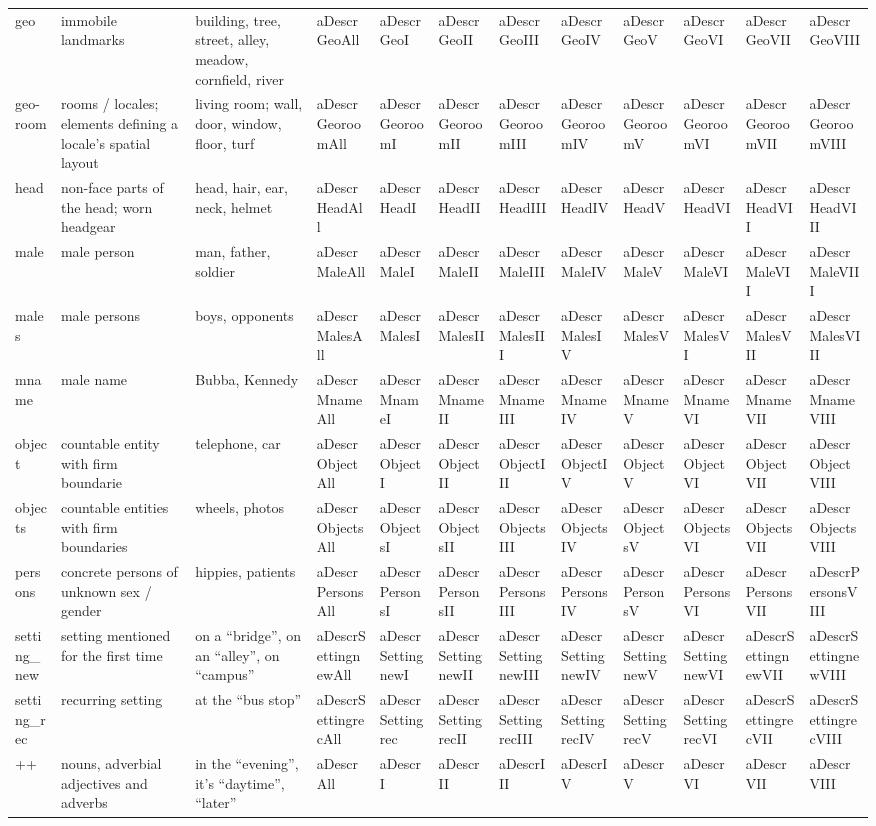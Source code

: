 \documentclass[english]{article}
\begin{document}
\begin{table}[t]
\begin{tabular}{llllllllllll}
geo & immobile landmarks & building, tree, street, alley, meadow, cornfield, river & aDescrGeoAll & aDescrGeoI & aDescrGeoII & aDescrGeoIII & aDescrGeoIV & aDescrGeoV & aDescrGeoVI & aDescrGeoVII & aDescrGeoVIII \tabularnewline
geo-room & rooms / locales; elements defining a locale's spatial layout & living room; wall, door, window, floor, turf & aDescrGeoroomAll & aDescrGeoroomI & aDescrGeoroomII & aDescrGeoroomIII & aDescrGeoroomIV & aDescrGeoroomV & aDescrGeoroomVI & aDescrGeoroomVII & aDescrGeoroomVIII \tabularnewline
head & non-face parts of the head; worn headgear & head, hair, ear, neck, helmet & aDescrHeadAll & aDescrHeadI & aDescrHeadII & aDescrHeadIII & aDescrHeadIV & aDescrHeadV & aDescrHeadVI & aDescrHeadVII & aDescrHeadVIII \tabularnewline
male & male person & man, father, soldier & aDescrMaleAll & aDescrMaleI & aDescrMaleII & aDescrMaleIII & aDescrMaleIV & aDescrMaleV & aDescrMaleVI & aDescrMaleVII & aDescrMaleVIII \tabularnewline
males & male persons & boys, opponents & aDescrMalesAll & aDescrMalesI & aDescrMalesII & aDescrMalesIII & aDescrMalesIV & aDescrMalesV & aDescrMalesVI & aDescrMalesVII & aDescrMalesVIII \tabularnewline
mname & male name & Bubba, Kennedy & aDescrMnameAll & aDescrMnameI & aDescrMnameII & aDescrMnameIII & aDescrMnameIV & aDescrMnameV & aDescrMnameVI & aDescrMnameVII & aDescrMnameVIII \tabularnewline
object & countable entity with firm boundarie & telephone, car & aDescrObjectAll & aDescrObjectI & aDescrObjectII & aDescrObjectIII & aDescrObjectIV & aDescrObjectV & aDescrObjectVI & aDescrObjectVII & aDescrObjectVIII \tabularnewline
objects & countable entities with firm boundaries &  wheels, photos & aDescrObjectsAll & aDescrObjectsI & aDescrObjectsII & aDescrObjectsIII & aDescrObjectsIV & aDescrObjectsV & aDescrObjectsVI & aDescrObjectsVII & aDescrObjectsVIII \tabularnewline
persons & concrete persons of unknown sex / gender & hippies, patients & aDescrPersonsAll & aDescrPersonsI & aDescrPersonsII & aDescrPersonsIII & aDescrPersonsIV & aDescrPersonsV & aDescrPersonsVI & aDescrPersonsVII & aDescrPersonsVIII \tabularnewline
setting\_new & setting mentioned for the first time &  on a ``bridge'', on an ``alley'', on ``campus'' & aDescrSettingnewAll & aDescrSettingnewI & aDescrSettingnewII & aDescrSettingnewIII & aDescrSettingnewIV & aDescrSettingnewV & aDescrSettingnewVI & aDescrSettingnewVII & aDescrSettingnewVIII \tabularnewline
setting\_rec & recurring setting & at the ``bus stop'' & aDescrSettingrecAll & aDescrSettingrec & aDescrSettingrecII & aDescrSettingrecIII & aDescrSettingrecIV & aDescrSettingrecV & aDescrSettingrecVI & aDescrSettingrecVII & aDescrSettingrecVIII \tabularnewline
++ & nouns, adverbial adjectives and adverbs & in the ``evening'', it's ``daytime'', ``later'' &  aDescrAll & aDescrI & aDescrII & aDescrIII & aDescrIV & aDescrV & aDescrVI & aDescrVII & aDescrVIII \tabularnewline
\bottomrule
\end{tabular}
\end{table}
\end{document}
